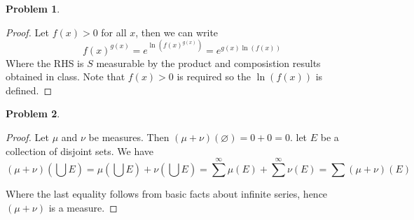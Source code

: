 \documentclass{article}
\newtheorem{prb}{Problem}
\begin{document}
\begin{prb}
	
\end{prb}

\begin{proof}
Let $f(x) > 0$ for all $x$, then we can write 
\[
	f(x)^{g(x)} = e^{\ln(f(x)^{g(x)})} = e^{g(x) \ln(f(x))}
\]
Where the RHS is $S$ measurable by the product and composistion results obtained in class. Note that $f(x) > 0$ is required so the $ \ln(f(x))$ is defined.  
\end{proof}

\begin{prb}
	
\end{prb}

\begin{proof}
 Let $\mu$ and $\nu$ be measures. Then $(\mu + \nu)(\varnothing) = 0 + 0 = 0$. let $E$  be a collection of disjoint sets. We have 
 \[
	 (\mu + \nu)(\bigcup E) = \mu(\bigcup E) + \nu( \bigcup E) = \sum^{\infty} \mu(E) + \sum^\infty \nu(E) = \sum (\mu + \nu)(E) \]

\noindent Where the last equality follows from basic facts about 
infinite series, hence $(\mu + \nu)$ is a measure. 
\end{proof}
\end{document}
